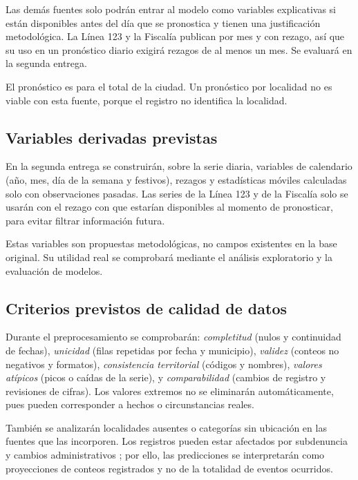 \documentclass[12pt,letterpaper]{article}
\begin{document}
Las demás fuentes solo podrán entrar al modelo como variables explicativas si están disponibles antes del día que se pronostica y tienen una justificación metodológica. La Línea 123 y la Fiscalía publican por mes y con rezago, así que su uso en un pronóstico diario exigirá rezagos de al menos un mes. Se evaluará en la segunda entrega.

El pronóstico es para el total de la ciudad. Un pronóstico por localidad no es viable con esta fuente, porque el registro no identifica la localidad.

\subsection{Variables derivadas previstas}

En la segunda entrega se construirán, sobre la serie diaria, variables de calendario (año, mes, día de la semana y festivos), rezagos y estadísticas móviles calculadas solo con observaciones pasadas. Las series de la Línea 123 y de la Fiscalía solo se usarán con el rezago con que estarían disponibles al momento de pronosticar, para evitar filtrar información futura.

Estas variables son propuestas metodológicas, no campos existentes en la base original. Su utilidad real se comprobará mediante el análisis exploratorio y la evaluación de modelos.

\subsection{Criterios previstos de calidad de datos}

Durante el preprocesamiento se comprobarán: \textit{completitud} (nulos y continuidad de fechas), \textit{unicidad} (filas repetidas por fecha y municipio), \textit{validez} (conteos no negativos y formatos), \textit{consistencia territorial} (códigos y nombres), \textit{valores atípicos} (picos o caídas de la serie), y \textit{comparabilidad} (cambios de registro y revisiones de cifras). Los valores extremos no se eliminarán automáticamente, pues pueden corresponder a hechos o circunstancias reales.

También se analizarán localidades ausentes o categorías sin ubicación en las fuentes que las incorporen. Los registros pueden estar afectados por subdenuncia y cambios administrativos \citep{riascos2023}; por ello, las predicciones se interpretarán como proyecciones de conteos registrados y no de la totalidad de eventos ocurridos.
\end{document}
